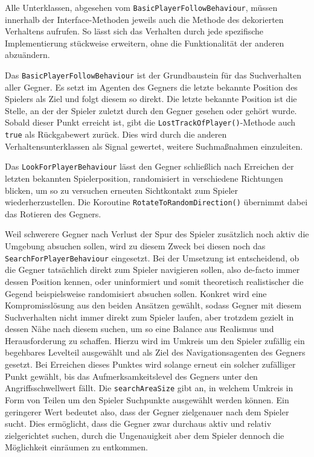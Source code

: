 Alle Unterklassen, abgesehen vom \texttt{BasicPlayerFollowBehaviour}, müssen innerhalb der Inter\-face-Methoden jeweils auch die Methode des dekorierten Verhaltens aufrufen. So lässt sich das Verhalten durch jede spezifische Implementierung stückweise erweitern, ohne die Funktionalität der anderen abzuändern.

Das \texttt{BasicPlayerFollowBehaviour} ist der Grundbaustein für das Suchverhalten aller Gegner. Es setzt im Agenten des Gegners die letzte bekannte Position des Spielers als Ziel und folgt diesem so direkt. Die letzte bekannte Position ist die Stelle, an der der Spieler zuletzt durch den Gegner gesehen oder gehört wurde. Sobald dieser Punkt erreicht ist, gibt die \texttt{LostTrackOfPlayer()}-Methode auch \texttt{true} als Rückgabewert zurück. Dies wird durch die anderen Verhaltensunterklassen als Signal gewertet, weitere Suchmaßnahmen einzuleiten.

Das \texttt{LookForPlayerBehaviour} lässt den Gegner schließlich nach Erreichen der letzten bekannten Spielerposition, randomisiert in verschiedene Richtungen blicken, um so zu versuchen erneuten Sichtkontakt zum Spieler wiederherzustellen. Die Koroutine \texttt{RotateToRandomDirection()} übernimmt dabei das Rotieren des Gegners.

Weil schwerere Gegner nach Verlust der Spur des Spieler zusätzlich noch aktiv die Umgebung absuchen sollen, wird zu diesem Zweck bei diesen noch das \texttt{SearchForPlayerBehaviour} eingesetzt. Bei der Umsetzung ist entscheidend, ob die Gegner tatsächlich direkt zum Spieler navigieren sollen, also de-facto immer dessen Position kennen, oder uninformiert und somit theoretisch realistischer die Gegend beispielsweise randomisiert absuchen sollen. Konkret wird eine Kompromisslösung aus den beiden Ansätzen gewählt, sodass Gegner mit diesem Suchverhalten nicht immer direkt zum Spieler laufen, aber trotzdem gezielt in dessen Nähe nach diesem suchen, um so eine Balance aus Realismus und Herausforderung zu schaffen. Hierzu wird im Umkreis um den Spieler zufällig ein begehbares Levelteil ausgewählt und als Ziel des Navigationsagenten des Gegners gesetzt. Bei Erreichen dieses Punktes wird solange erneut ein solcher zufälliger Punkt gewählt, bis das Aufmerksamkeitslevel des Gegners unter den Angriffsschwellwert fällt. Die \texttt{searchAreaSize} gibt an, in welchem Umkreis in Form von Teilen um den Spieler Suchpunkte ausgewählt werden können. Ein geringerer Wert bedeutet also, dass der Gegner zielgenauer nach dem Spieler sucht. Dies ermöglicht, dass die Gegner zwar durchaus aktiv und relativ zielgerichtet suchen, durch die Ungenauigkeit aber dem Spieler dennoch die Möglichkeit einräumen zu entkommen.
